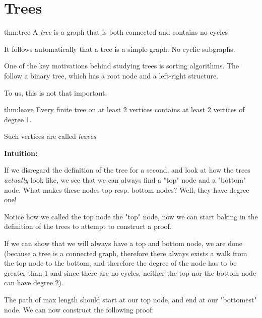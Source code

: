 \section{Trees}
\par\bigskip
\begin{theo}[Tree]{thm:tree}
  A \textit{tree} is a graph that is both connected and contains no cycles
  \par\bigskip
  \noindent It follows automatically that a tree is a simple graph. No cyclic subgraphs. 
\end{theo}
\par\bigskip
\noindent One of the key motivations behind studying trees is sorting algorithms. The follow a binary tree, which has a root node and a left-right structure.\par
\noindent To us, this is not that important.
\par\bigskip
\begin{lem}[Leaves]{thm:leave}
  Every finite tree on at least 2 vertices contains at least 2 vertices of degree 1.
  \par\bigskip
  \noindent Such vertices are called \textit{leaves}
\end{lem}
\par\bigskip
\noindent\textbf{Intuition:}\par
\noindent If we disregard the definition of the tree for a second, and look at how the trees \textit{actually} look like, we see that we can always find a "top" node and a "bottom" node. What makes these nodes top resp. bottom nodes? Well, they have degree one!
\par\bigskip
\noindent Notice how we called the top node the "top" node, now we can start baking in the definition of the trees to attempt to construct a proof.\par
\noindent If we can show that we will always have a top and bottom node, we are done (because a tree is a connected graph, therefore there always exists a walk from the top node to the bottom, and therefore the degree of the node has to be greater than 1 and since there are no cycles, neither the top nor the bottom node can have degree 2).
\par\bigskip
\noindent The path of max length should start at our top node, and end at our "bottomest" node. We can now construct the following proof: 
\par\bigskip
